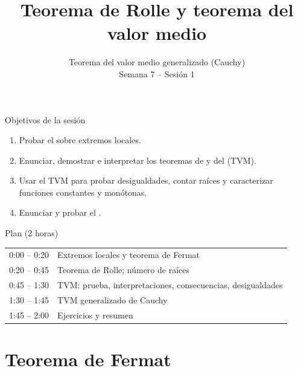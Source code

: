 \documentclass[10pt,aspectratio=169]{beamer}
\title[Rolle y valor medio]{Teorema de Rolle y teorema del valor medio}
\subtitle{Teorema del valor medio generalizado (Cauchy)\\[2pt]\small Semana 7 -- Sesión 1}
\begin{document}
\begin{frame}
  \titlepage
\end{frame}

\begin{frame}{Objetivos de la sesión}
  \begin{enumerate}
    \item Probar el  sobre extremos locales.
    \item Enunciar, demostrar e interpretar los teoremas de  y del  (TVM).
    \item Usar el TVM para probar desigualdades, contar raíces y caracterizar funciones constantes y monótonas.
    \item Enunciar y probar el .
  \end{enumerate}
  \begin{block}{Plan (2 horas)}
    \begin{tabular}{ll}
      0:00 -- 0:20 & Extremos locales y teorema de Fermat\\
      0:20 -- 0:45 & Teorema de Rolle; número de raíces\\
      0:45 -- 1:30 & TVM: prueba, interpretaciones, consecuencias, desigualdades\\
      1:30 -- 1:45 & TVM generalizado de Cauchy\\
      1:45 -- 2:00 & Ejercicios y resumen
    \end{tabular}
  \end{block}
\end{frame}

\section{Teorema de Fermat}
\end{document}
